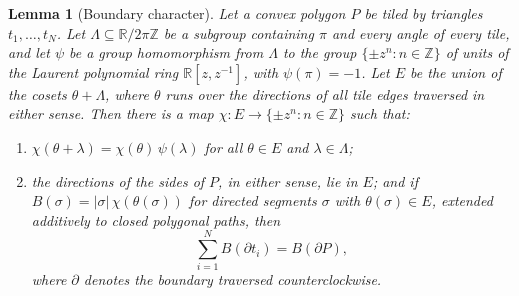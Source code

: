 \documentclass[11pt]{amsart}
\newtheorem{lemma}[theorem]{Lemma}
\theoremstyle{remark}
\newcommand{\Z}{\mathbb{Z}}
\newcommand{\R}{\mathbb{R}}
\begin{document}
\begin{lemma}[Boundary character]\label{lem:character}
Let a convex polygon $P$ be tiled by triangles $t_1,\dots,t_N$. Let $\Lambda\subseteq\R/2\pi\Z$ be a subgroup containing $\pi$ and every angle of every tile, and let $\psi$ be a group homomorphism from $\Lambda$ to the group $\{\pm z^n:n\in\Z\}$ of units of the Laurent polynomial ring $\R[z,z^{-1}]$, with $\psi(\pi)=-1$. Let $E$ be the union of the cosets $\theta+\Lambda$, where $\theta$ runs over the directions of all tile edges traversed in either sense. Then there is a map $\chi:E\to\{\pm z^n:n\in\Z\}$ such that:
\begin{enumerate}
\item[(i)] $\chi(\theta+\lambda)=\chi(\theta)\,\psi(\lambda)$ for all $\theta\in E$ and $\lambda\in\Lambda$;
\item[(ii)] the directions of the sides of $P$, in either sense, lie in $E$; and if $B(\sigma)=|\sigma|\,\chi(\theta(\sigma))$ for directed segments $\sigma$ with $\theta(\sigma)\in E$, extended additively to closed polygonal paths, then
\[
\sum_{i=1}^{N}B(\partial t_i)=B(\partial P),
\]
where $\partial$ denotes the boundary traversed counterclockwise.
\end{enumerate}
\end{lemma}
\end{document}
